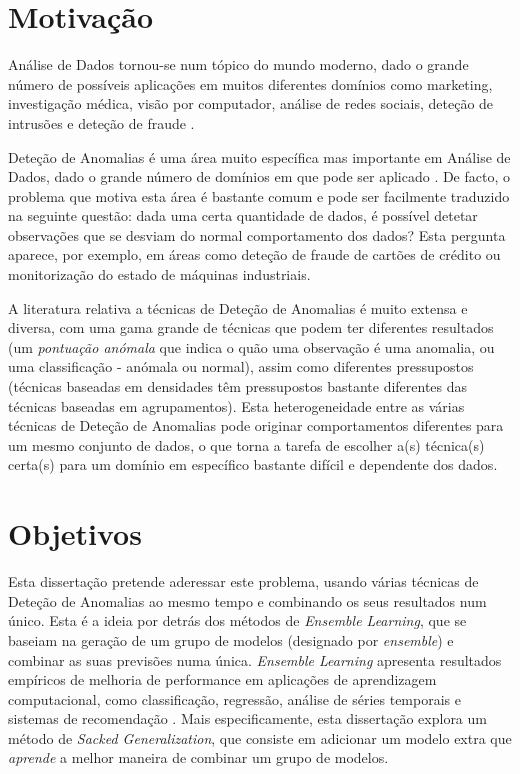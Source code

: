 \documentclass[9pt,a4paper]{extarticle}
\begin{document}
	\begin{multicols}{2}
		
		\section{Motivação}\label{sec:motiva}
		
		Análise de Dados tornou-se num tópico do mundo moderno, dado o grande número de possíveis aplicações em muitos diferentes domínios como marketing, investigação médica, visão por computador, análise de redes sociais, deteção de intrusões e deteção de fraude \cite{Aggarwal:2015:DMT:2778285}.
		
		Deteção de Anomalias é uma área muito específica mas importante em Análise de Dados, dado o grande número de domínios em que pode ser aplicado \cite{Kandhari2009}. De facto, o problema que motiva esta área é bastante comum e pode ser facilmente traduzido na seguinte questão: dada uma certa quantidade de dados, é possível detetar observações que se desviam do normal comportamento dos dados? Esta pergunta aparece, por exemplo, em áreas como deteção de fraude de cartões de crédito ou monitorização do estado de máquinas industriais.
		
		A literatura relativa a técnicas de Deteção de Anomalias é muito extensa e diversa, com uma gama grande de técnicas que podem ter diferentes resultados (um \textit{pontuação anómala} que indica o quão uma observação é uma anomalia, ou uma classificação - anómala ou normal), assim como diferentes pressupostos (técnicas baseadas em densidades têm pressupostos bastante diferentes das técnicas baseadas em agrupamentos). Esta heterogeneidade entre as várias técnicas de Deteção de Anomalias pode originar comportamentos diferentes para um mesmo conjunto de dados, o que torna a tarefa de escolher a(s) técnica(s) certa(s) para um domínio em específico bastante difícil e dependente dos dados.
		
		\section{Objetivos}\label{sec:goals}
		
		Esta dissertação pretende aderessar este problema, usando várias técnicas de Deteção de Anomalias ao mesmo tempo e combinando os seus resultados num único. Esta é a ideia por detrás dos métodos de \textit{Ensemble Learning}, que se baseiam na geração de um grupo de modelos (designado por \textit{ensemble}) e combinar as suas previsões numa única. \textit{Ensemble Learning} apresenta resultados empíricos de melhoria de performance em aplicações de aprendizagem computacional, como classificação, regressão, análise de séries temporais e sistemas de recomendação \cite{Aggarwal:2013:OA:2436823}.
		Mais especificamente, esta dissertação explora um método de \textit{Sacked Generalization}, que consiste em adicionar um modelo extra que \textit{aprende} a melhor maneira de combinar um grupo de modelos.
		

\end{multicols}
\end{document}
